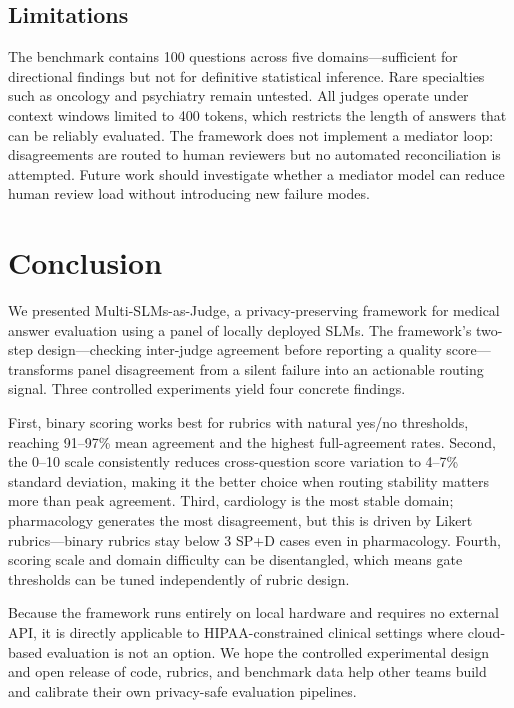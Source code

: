 \documentclass[conference]{IEEEtran}
\begin{document}
\subsection{Limitations}

The benchmark contains 100 questions across five domains---sufficient
for directional findings but not for definitive statistical inference.
Rare specialties such as oncology and psychiatry remain untested. All
judges operate under context windows limited to 400 tokens, which
restricts the length of answers that can be reliably evaluated. The
framework does not implement a mediator loop: disagreements are routed
to human reviewers but no automated reconciliation is attempted. Future
work should investigate whether a mediator model can reduce human review
load without introducing new failure modes.

\section{Conclusion}

We presented Multi-SLMs-as-Judge, a privacy-preserving framework for
medical answer evaluation using a panel of locally deployed SLMs. The
framework's two-step design---checking inter-judge agreement before
reporting a quality score---transforms panel disagreement from a silent
failure into an actionable routing signal. Three controlled experiments
yield four concrete findings.

First, binary scoring works best for rubrics with natural yes/no
thresholds, reaching 91--97\% mean agreement and the highest
full-agreement rates. Second, the 0--10 scale consistently reduces
cross-question score variation to 4--7\% standard deviation, making
it the better choice when routing stability matters more than peak
agreement. Third, cardiology is the most stable domain; pharmacology
generates the most disagreement, but this is driven by Likert
rubrics---binary rubrics stay below 3 SP+D cases even in pharmacology.
Fourth, scoring scale and domain difficulty can be disentangled, which
means gate thresholds can be tuned independently of rubric design.

Because the framework runs entirely on local hardware and requires no
external API, it is directly applicable to HIPAA-constrained clinical
settings where cloud-based evaluation is not an option. We hope the
controlled experimental design and open release of code, rubrics, and
benchmark data help other teams build and calibrate their own
privacy-safe evaluation pipelines.
\end{document}
